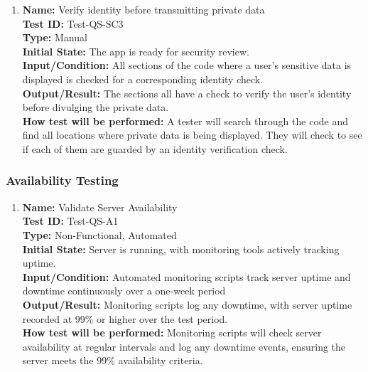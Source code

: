 \documentclass[12pt, titlepage]{article}
\begin{document}
\begin{enumerate}
\begin{enumerate}
    \item
    \textbf{Name:} Verify identity before transmitting private data \label{itm:Test-QS-SC3} \\
    \textbf{Test ID:} Test-QS-SC3 \\
    \textbf{Type:} Manual \\
    \textbf{Initial State:} The app is ready for security review. \\
    \textbf{Input/Condition:} All sections of the code where a user's sensitive data is displayed is checked for a corresponding identity check. \\
    \textbf{Output/Result:} The sections all have a check to verify the user's identity before divulging the private data. \\
    \textbf{How test will be performed:} A tester will search through the code and find all locations where private data is being displayed. They will check to see if each of them are guarded by an identity verification check.

\end{enumerate}
\subsubsection{Availability Testing}

\begin{enumerate}
    
\item \textbf{Name:} Validate Server Availability \label{itm:Test-QS-A1} \\
    \textbf{Test ID:} Test-QS-A1 \\
    \textbf{Type:} Non-Functional, Automated \\
    \textbf{Initial State:} Server is running, with monitoring tools actively tracking uptime. \\
    \textbf{Input/Condition:} Automated monitoring scripts track server uptime and downtime continuously over a one-week period \\
    \textbf{Output/Result:} Monitoring scripts log any downtime, with server uptime recorded at 99\% or higher over the test period. \\
    \textbf{How test will be performed:} Monitoring scripts will check server availability at regular intervals and log any downtime events, ensuring the server meets the 99\% availability criteria.



\end{enumerate}
\end{enumerate}
\end{document}
